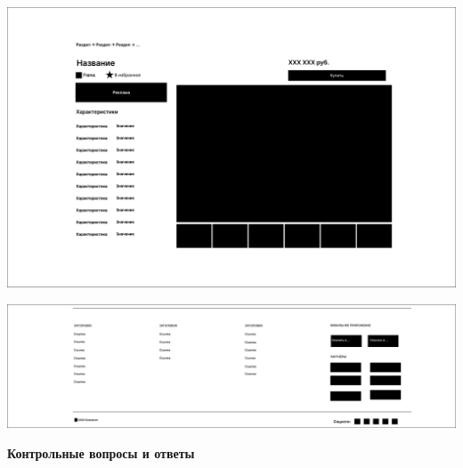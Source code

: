 \noindent
\begin{minipage}{\linewidth}
    \includegraphics[width=\linewidth]{Selected}
\end{minipage}
\bigskip

\noindent
\begin{minipage}{\linewidth}
    \includegraphics[width=\linewidth]{Footer}
\end{minipage}
\bigskip

\textbf{Контрольные вопросы и ответы}

